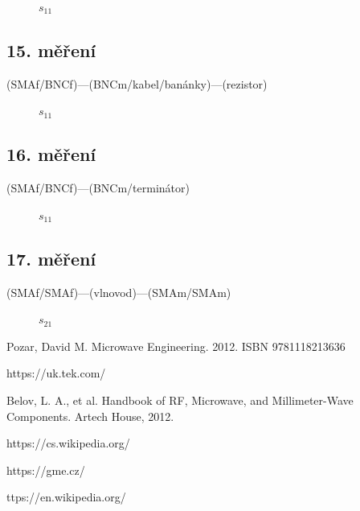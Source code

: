 \documentclass{protokol}
\begin{document}
\begin{figure}[htp]
	\centering
	
	\caption{$s_{11}$}
	\label{fig:14-s11}
\end{figure}

\subsection{15. měření}
(SMAf/BNCf)---(BNCm/kabel/banánky)---(rezistor)

\begin{figure}[htp]
	\centering
	
	\caption{$s_{11}$}
	\label{fig:15-s11}
\end{figure}

\subsection{16. měření}
(SMAf/BNCf)---(BNCm/terminátor)

\begin{figure}[htp]
	\centering
	
	\caption{$s_{11}$}
	\label{fig:16-s11}
\end{figure}

\subsection{17. měření}
(SMAf/SMAf)---(vlnovod)---(SMAm/SMAm)

\begin{figure}[htp]
	\centering
	
	\caption{$s_{21}$}
	\label{fig:17-s21}
\end{figure}

\newpage
\begin{thebibliography}{}

	Pozar, David M. Microwave Engineering. 2012. ISBN 9781118213636

	https://uk.tek.com/

	Belov, L. A., et al. Handbook of RF, Microwave, and Millimeter-Wave Components. Artech House, 2012.

	https://cs.wikipedia.org/

	https://gme.cz/

	ttps://en.wikipedia.org/

\end{thebibliography}
\end{document}
